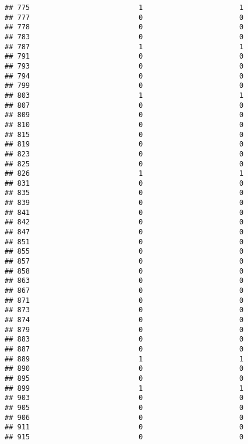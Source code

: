 \documentclass[
]{article}
\begin{document}
\begin{verbatim}
## 775                          1                       1
## 777                          0                       0
## 778                          0                       0
## 783                          0                       0
## 787                          1                       1
## 791                          0                       0
## 793                          0                       0
## 794                          0                       0
## 799                          0                       0
## 803                          1                       1
## 807                          0                       0
## 809                          0                       0
## 810                          0                       0
## 815                          0                       0
## 819                          0                       0
## 823                          0                       0
## 825                          0                       0
## 826                          1                       1
## 831                          0                       0
## 835                          0                       0
## 839                          0                       0
## 841                          0                       0
## 842                          0                       0
## 847                          0                       0
## 851                          0                       0
## 855                          0                       0
## 857                          0                       0
## 858                          0                       0
## 863                          0                       0
## 867                          0                       0
## 871                          0                       0
## 873                          0                       0
## 874                          0                       0
## 879                          0                       0
## 883                          0                       0
## 887                          0                       0
## 889                          1                       1
## 890                          0                       0
## 895                          0                       0
## 899                          1                       1
## 903                          0                       0
## 905                          0                       0
## 906                          0                       0
## 911                          0                       0
## 915                          0                       0

\end{verbatim}
\end{document}
